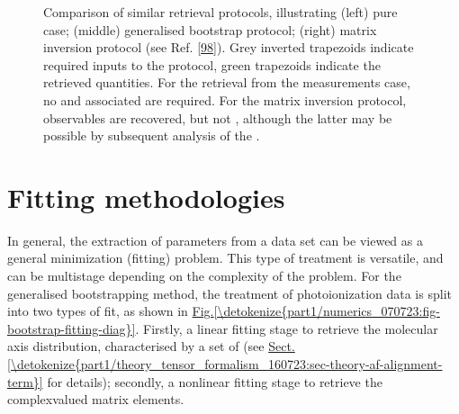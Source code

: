 \documentclass[letterpaper,table,10pt,english]{jupyterBook}
\begin{document}
\begin{figure}[htbp]
\centering
\capstart

\noindent{}
\caption{Comparison of similar {\hyperref[\detokenize{backmatter/glossary:term-radial-matrix-elements}]{}} retrieval protocols, illustrating (left) pure {\hyperref[\detokenize{backmatter/glossary:term-MF}]{}} case; (middle) generalised bootstrap protocol; (right) matrix inversion protocol (see Ref. {[}\hyperlink{cite.backmatter/bibliography:id634}{98}{]}).  Grey inverted trapezoids indicate required inputs to the protocol, green trapezoids indicate the retrieved quantities. For the retrieval from the {\hyperref[\detokenize{backmatter/glossary:term-MF}]{}} measurements case, no {\hyperref[\detokenize{backmatter/glossary:term-RWP}]{}} and associated {\hyperref[\detokenize{backmatter/glossary:term-ADMs}]{}} are required. For the matrix inversion protocol, {\hyperref[\detokenize{backmatter/glossary:term-MF}]{}} observables are recovered, but not {\hyperref[\detokenize{backmatter/glossary:term-radial-matrix-elements}]{}}, although the latter may be possible by subsequent analysis of the {\hyperref[\detokenize{backmatter/glossary:term-MF}]{}}.}\label{\detokenize{part1/numerics_070723:fig-general-fitting-diag}}\end{figure}


\section{Fitting methodologies}
\label{\detokenize{part1/numerics_070723:fitting-methodologies}}\label{\detokenize{part1/numerics_070723:sec-numerics-fitting-methodologies}}
\sphinxAtStartPar
In general, the extraction of parameters from a data set can be viewed as a general minimization (fitting) problem. This type of treatment is versatile, and can be multi\sphinxhyphen{}stage depending on the complexity of the problem. For the generalised bootstrapping method, the treatment of photoionization data is split into two types of fit, as shown in \hyperref[\detokenize{part1/numerics_070723:fig-bootstrap-fitting-diag}]{Fig.\@ \ref{\detokenize{part1/numerics_070723:fig-bootstrap-fitting-diag}}}. Firstly, a linear fitting stage to retrieve the molecular axis distribution, characterised by a set of {\hyperref[\detokenize{backmatter/glossary:term-ADMs}]{}} (see \hyperref[\detokenize{part1/theory_tensor_formalism_160723:sec-theory-af-alignment-term}]{Sect.\@ \ref{\detokenize{part1/theory_tensor_formalism_160723:sec-theory-af-alignment-term}}} for details); secondly, a non\sphinxhyphen{}linear fitting stage to retrieve the complex\sphinxhyphen{}valued matrix elements.
\end{document}
